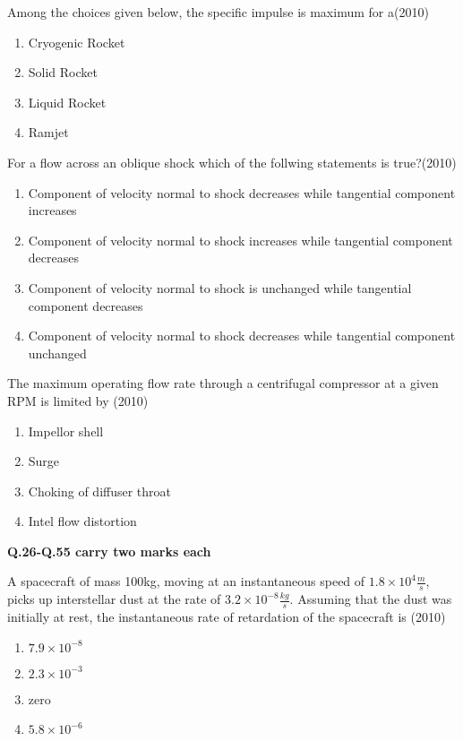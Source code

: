  \item Among the choices given below, the specific impulse is maximum for a\hfill (2010) 
 \begin{enumerate}[label=(\Alph*)]
    \item Cryogenic Rocket
    \item Solid Rocket
    \item Liquid Rocket
    \item Ramjet
 \end{enumerate}
\item For a flow across an oblique shock which of the follwing statements is true?\hfill (2010)
\begin{enumerate}[label=(\Alph*)]
    \item Component of velocity normal to shock decreases while tangential component increases
    \item Component of velocity normal to shock increases while tangential component decreases
    \item Component of velocity normal to shock is unchanged while tangential component decreases
    \item Component of velocity normal to shock decreases while tangential component unchanged
\end{enumerate}
\item The maximum operating flow rate through a centrifugal compressor at a given RPM is limited by \hfill (2010) 
\begin{enumerate}[label=(\Alph*)]
    \item Impellor shell
    \item Surge
    \item Choking of diffuser throat
    \item Intel flow distortion
\end{enumerate}
\textbf{Q.26-Q.55 carry two marks each}
\item A spacecraft of mass 100kg, moving at an instantaneous speed of $1.8\times 10^4\frac{m}{s}$, picks up interstellar dust at the rate of $3.2\times 10^{-8}\frac{kg}{s}$. Assuming that the dust was initially at rest, the instantaneous rate of retardation of the spacecraft is \hfill (2010)
\begin{enumerate}[label=(\Alph*)]
    \item $7.9\times10^{-8}$
    \item $2.3\times10^{-3}$
    \item zero
    \item $5.8\times10^{-6}$
\end{enumerate}


